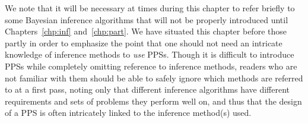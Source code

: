 We note that it will be necessary at times during this chapter to refer briefly to some Bayesian inference
algorithms that will not be properly introduced until Chapters~\ref{chp:inf} and~\ref{chp:part}.  
We have situated this chapter before those partly in order to emphasize the point that one should not 
need an intricate knowledge of inference methods to \emph{use} PPSs.  Though it is difficult
to introduce PPSs while completely omitting reference to inference methods, readers who
are not familiar with them should be able to safely ignore which methods are referred to
at a first pass, noting only that different inference algorithms have different requirements and sets 
of problems they perform well on, and thus that the design of a PPS is often intricately linked to the inference
method(s) used.






%
%
